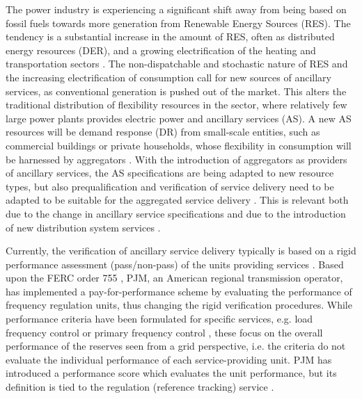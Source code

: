 The power industry is experiencing a significant shift away from being based on fossil fuels towards more generation from Renewable Energy Sources (RES). The tendency is a substantial increase in the amount of RES, often as distributed energy resources (DER), and a growing electrification of the heating and transportation sectors \cite{iea2012a,eurelectric2011}. The non-dispatchable and stochastic nature of RES and the increasing electrification of consumption call for new sources of ancillary services, as conventional generation is pushed out of the market. This alters the traditional distribution of flexibility resources in the sector, where relatively few large power plants provides electric power and ancillary services (AS). A new AS resources will be demand response (DR) from small-scale entities, such as commercial buildings or private households, whose flexibility in consumption will be harnessed by aggregators \cite{pudjianto2007virtual,koch2011modeling,biegel2013primary,vrettos2015integrating,mathieu2012using,sullivan2013using}. 
With the introduction of aggregators as providers of ancillary services, the AS specifications are being adapted to new resource types, but also prequalification and verification of service delivery need to be adapted to be suitable for the aggregated service delivery \cite{bode2013incorporating}. This is relevant both due to the change in ancillary service specifications and due to the introduction of new distribution system services \cite{heussen2013clearinghouse}.

Currently, the verification of ancillary service delivery typically is based on a rigid performance assessment (pass/non-pass) of the units providing services \cite{EnerginetAncillary}. Based upon the FERC order 755 \cite{order755}, PJM, an American regional transmission operator, has implemented a pay-for-performance scheme by evaluating the performance of frequency regulation units, thus changing the rigid verification procedures.
While performance criteria have been formulated for specific services, e.g. load frequency control \cite{gross2001analysis} or primary frequency control \cite{eto2010use}, these focus on the overall performance of the reserves seen from a grid perspective, i.e. the criteria do not evaluate the individual performance of each service-providing unit. PJM has introduced a performance score which evaluates the unit performance, but its definition is tied to the regulation (reference tracking) service \cite{pjm2015balance}.

